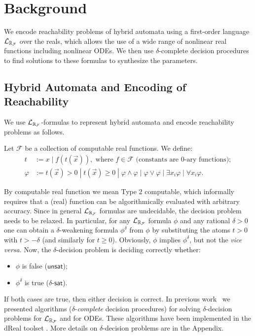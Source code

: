 \section{Background}

We encode reachability problems of hybrid automata using a first-order language $\mathcal{L}_{\mathbb{R}_{\mathcal{F}}}$ over the reals, 
which allows the use of a wide range of nonlinear real functions including nonlinear ODEs. 
We then use $\delta$-complete decision procedures to find solutions to these formulas to synthesize 
the parameters. 

\subsection{Hybrid Automata and Encoding of Reachability}\label{language}
We use $\mathcal{L}_{\mathbb{R}_{\mathcal{F}}}$-formulas to represent hybrid automata and encode reachability problems as follows. 
\begin{definition}
Let $\mathcal{F}$ be a collection of computable real functions. We define:
\begin{align*}
t& := x \; | \; f(t(\vec x)), \mbox{ where }f\in \mathcal{F} \mbox{ (constants are 0-ary functions)};\\
\varphi& := t(\vec x)> 0 \; | \; t(\vec x)\geq 0 \; | \; \varphi\wedge\varphi
\; | \; \varphi\vee\varphi \; | \; \exists x_i\varphi \; |\; \forall x_i\varphi.
\end{align*}
\end{definition}
By computable real function we mean Type 2 computable, which informally requires that a (real) 
function can be algorithmically evaluated with arbitrary accuracy. Since in general 
$\mathcal{L}_{\mathbb{R}_{\mathcal{F}}}$ formulas are undecidable, the decision problem needs to be relaxed. In particular, for 
any $\mathcal{L}_{\mathbb{R}_{\mathcal{F}}}$ formula $\phi$ and any rational $\delta >0$ one can obtain a $\delta$-weakening 
formula $\phi^\delta$ from $\phi$ by substituting the atoms $t > 0$ with $t > -\delta$ (and
similarly for $t \geq 0$). Obviously, $\phi$ implies $\phi^\delta$, but not the {\em vice versa}.
Now, the $\delta$-decision problem is deciding correctly whether:
\begin{itemize}
	\item $\phi$ is false ($\mathsf{unsat}$);
	\item $\phi^\delta$ is true ($\delta$-$\mathsf{sat}$).
\end{itemize}
If both cases are true, then either decision is correct. In previous work~\cite{gao12a,gao12b,gao13}
we presented algorithms ($\delta$-{\em complete} decision procedures) for solving $\delta$-decision 
problems for $\mathcal{L}_{\mathbb{R}_{\mathcal{F}}}$ and for ODEs. These algorithms have been implemented in the dReal 
toolset \cite{dreal}. More details on $\delta$-decision problems are in the Appendix. 

